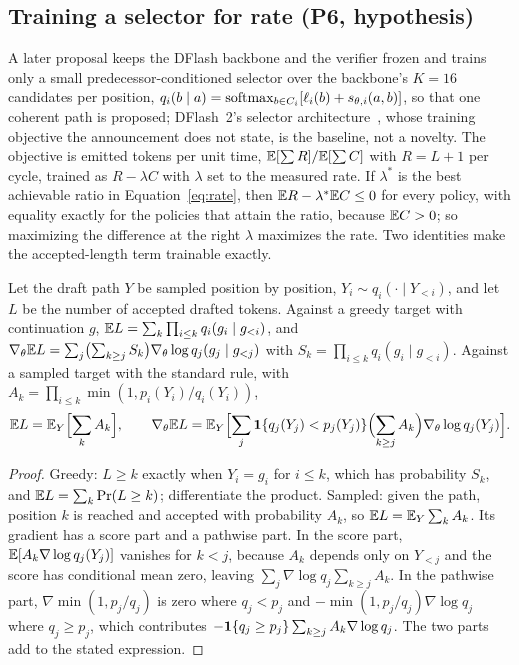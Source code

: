 \subsection{Training a selector for rate (P6, hypothesis)}\label{app:selector}\label{sec:drafter-selector}
A later proposal keeps the DFlash backbone and the verifier frozen and trains only a small predecessor-conditioned selector over the backbone's $K=16$ candidates per position, $q_i(b\mid a)=\operatorname{softmax}_{b\in C_i}[\ell_i(b)+s_{\theta,i}(a,b)]$, so that one coherent path is proposed; DFlash~2's selector architecture~\cite{dflash}, whose training objective the announcement does not state, is the baseline, not a novelty. The objective is emitted tokens per unit time, $\mathbb E[\sum R]/\mathbb E[\sum C]$ with $R=L+1$ per cycle, trained as $R-\lambda C$ with $\lambda$ set to the measured rate. If $\lambda^\ast$ is the best achievable ratio in Equation~\eqref{eq:rate}, then $\mathbb E R-\lambda^\ast\mathbb E C\le0$ for every policy, with equality exactly for the policies that attain the ratio, because $\mathbb E C>0$; so maximizing the difference at the right $\lambda$ maximizes the rate. Two identities make the accepted-length term trainable exactly.
\begin{proposition}\label{prop:prefix-value}
Let the draft path $Y$ be sampled position by position, $Y_i\sim q_i(\cdot\mid Y_{<i})$, and let $L$ be the number of accepted drafted tokens. Against a greedy target with continuation $g$, $\mathbb E L=\sum_k\prod_{i\le k}q_i(g_i\mid g_{<i})$, and $\nabla_\theta\mathbb E L=\sum_j\bigl(\sum_{k\ge j}S_k\bigr)\nabla_\theta\log q_j(g_j\mid g_{<j})$ with $S_k=\prod_{i\le k}q_i(g_i\mid g_{<i})$. Against a sampled target with the standard rule, with $A_k=\prod_{i\le k}\min(1,p_i(Y_i)/q_i(Y_i))$,
\[\mathbb E L=\mathbb E_Y\Bigl[\sum_kA_k\Bigr],\qquad\nabla_\theta\mathbb E L=\mathbb E_Y\Bigl[\sum_j\mathbf 1\{q_j(Y_j)<p_j(Y_j)\}\Bigl(\sum_{k\ge j}A_k\Bigr)\nabla_\theta\log q_j(Y_j)\Bigr].\]
\end{proposition}
\begin{proof}
Greedy: $L\ge k$ exactly when $Y_i=g_i$ for $i\le k$, which has probability $S_k$, and $\mathbb E L=\sum_k\Pr(L\ge k)$; differentiate the product. Sampled: given the path, position $k$ is reached and accepted with probability $A_k$, so $\mathbb E L=\mathbb E_Y\sum_kA_k$. Its gradient has a score part and a pathwise part. In the score part, $\mathbb E[A_k\nabla\log q_j(Y_j)]$ vanishes for $k<j$, because $A_k$ depends only on $Y_{<j}$ and the score has conditional mean zero, leaving $\sum_j\nabla\log q_j\sum_{k\ge j}A_k$. In the pathwise part, $\nabla\min(1,p_j/q_j)$ is zero where $q_j<p_j$ and $-\min(1,p_j/q_j)\nabla\log q_j$ where $q_j\ge p_j$, which contributes $-\mathbf 1\{q_j\ge p_j\}\sum_{k\ge j}A_k\nabla\log q_j$. The two parts add to the stated expression.
\end{proof}
